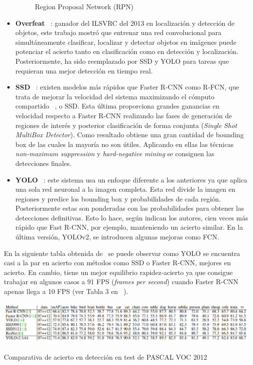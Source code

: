 \documentclass{bmvc2k}
\begin{document}
\begin{itemize}
\begin{figure}[h!]
\begin{center}
\caption{Region Proposal Network (RPN)}
\label{fig:fasterrcnn}
\end{center}
\end{figure}
\item \textbf{Overfeat} ~\cite{sermanet2013overfeat}: ganador del ILSVRC del 2013 en localización y detección de objetos, este trabajo mostró que entrenar una red convolucional para simultáneamente clasificar, localizar y detectar objetos en imágenes puede potenciar el acierto tanto en clasificación como en detección y localización. Posteriormente, ha sido reemplazado por SSD y YOLO para tareas que requieran una mejor detección en tiempo real.
\item \textbf{SSD} ~\cite{liu2016ssd}: existen modelos más rápidos que Faster R-CNN como R-FCN, que trata de mejorar la velocidad del sistema maximizando el cómputo compartido ~\cite{dai2016r}, o SSD. Esta última proporciona grandes ganancias en velocidad respecto a Faster R-CNN realizando las fases de generación de regiones de interés y posterior clasificación de forma conjunta (\textit{Single Shot MultiBox Detector}). Como resultado obtiene una gran cantidad de bounding box de las cuales la mayoría no son útiles. Aplicando en ellas las técnicas \textit{non-maximum suppression} y \textit{hard-negative mining} se consiguen las detecciones finales.
\item \textbf{YOLO} ~\cite{redmon2016yolo9000}: este sistema usa un enfoque diferente a los anteriores ya que aplica una sola red neuronal a la imagen completa. Esta red divide la imagen en regiones y predice los bounding box y probabilidades de cada región. Posteriormente estas son ponderadas con las probabilidades para obtener las detecciones definitivas. Esto lo hace, según indican los autores, cien veces más rápido que Fast R-CNN, por ejemplo, manteniendo un acierto similar. En la última versión, YOLOv2, se introducen algunas mejoras como FCN.
\end{itemize}
En la siguiente tabla obtenida de~\cite{redmon2016yolo9000} se puede observar como YOLO se encuentra casi a la par en acierto con métodos como SSD o Faster R-CNN, mejores en acierto. En cambio, tiene un mejor equilibrio rapidez-acierto ya que consigue trabajar en algunos casos a 91 FPS (\textit{frames per second}) cuando Faster R-CNN apenas llega a 10 FPS (ver Tabla 3 en ~\cite{redmon2016yolo9000}).
\begin{table}[h!]
\begin{center}
\includegraphics[scale=0.35]{yolo_results_pascal12.png}
\caption{Comparativa de acierto en detección en test de PASCAL VOC 2012}
\end{center}
\end{table}
\end{document}
